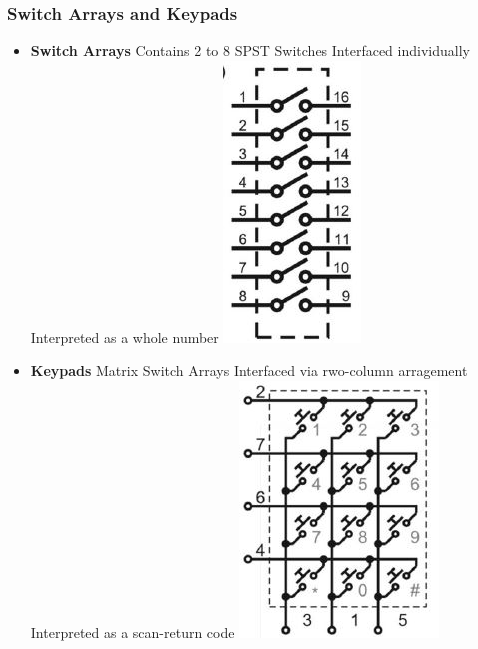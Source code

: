 \subsubsection{Switch Arrays and Keypads}
\begin{multicols}{2}
	\begin{itemize}
		\item \textbf{Switch Arrays}
		\subitem Contains 2 to 8 SPST Switches
		\subitem Interfaced individually
		\subitem Interpreted as a whole number
		\includegraphics[width=0.3\linewidth]{images/Switch_Array.jpg}  
		\item \textbf{Keypads}
		\subitem Matrix Switch Arrays
		\subitem Interfaced via rwo-column arragement
		\subitem Interpreted as a scan-return code 
		\includegraphics[width=0.5\linewidth]{images/Keypad.jpg}
	\end{itemize}
\end{multicols}
